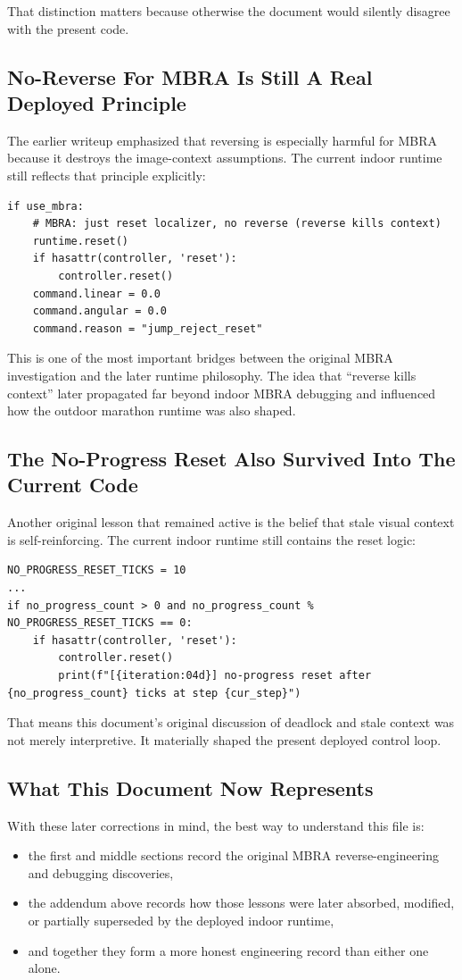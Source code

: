 \documentclass[11pt,a4paper]{article}
\begin{document}
That distinction matters because otherwise the document would silently disagree with the present code.

\subsection{No-Reverse For MBRA Is Still A Real Deployed Principle}
The earlier writeup emphasized that reversing is especially harmful for MBRA because it destroys the image-context assumptions. The current indoor runtime still reflects that principle explicitly:
\begin{verbatim}
if use_mbra:
    # MBRA: just reset localizer, no reverse (reverse kills context)
    runtime.reset()
    if hasattr(controller, 'reset'):
        controller.reset()
    command.linear = 0.0
    command.angular = 0.0
    command.reason = "jump_reject_reset"
\end{verbatim}

This is one of the most important bridges between the original MBRA investigation and the later runtime philosophy. The idea that ``reverse kills context'' later propagated far beyond indoor MBRA debugging and influenced how the outdoor marathon runtime was also shaped.

\subsection{The No-Progress Reset Also Survived Into The Current Code}
Another original lesson that remained active is the belief that stale visual context is self-reinforcing. The current indoor runtime still contains the reset logic:
\begin{verbatim}
NO_PROGRESS_RESET_TICKS = 10
...
if no_progress_count > 0 and no_progress_count % NO_PROGRESS_RESET_TICKS == 0:
    if hasattr(controller, 'reset'):
        controller.reset()
        print(f"[{iteration:04d}] no-progress reset after {no_progress_count} ticks at step {cur_step}")
\end{verbatim}

That means this document's original discussion of deadlock and stale context was not merely interpretive. It materially shaped the present deployed control loop.

\subsection{What This Document Now Represents}
With these later corrections in mind, the best way to understand this file is:
\begin{itemize}[leftmargin=*]
\item the first and middle sections record the original MBRA reverse-engineering and debugging discoveries,
\item the addendum above records how those lessons were later absorbed, modified, or partially superseded by the deployed indoor runtime,
\item and together they form a more honest engineering record than either one alone.
\end{itemize}
\end{document}

